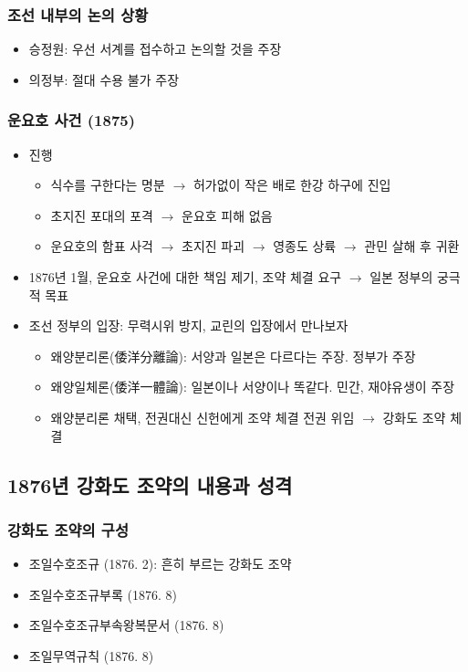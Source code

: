 \subsubsection*{조선 내부의 논의 상황}
\begin{itemize}
    \item 승정원: 우선 서계를 접수하고 논의할 것을 주장
    \item 의정부: 절대 수용 불가 주장
\end{itemize}

\subsubsection*{운요호 사건 (1875)}
\begin{itemize}
    \item 진행
    \begin{itemize}
        \item 식수를 구한다는 명분 $\rightarrow$ 허가없이 작은 배로 한강 하구에 진입
        \item 초지진 포대의 포격 $\rightarrow$ 운요호 피해 없음
        \item 운요호의 함표 사걱 $\rightarrow$ 초지진 파괴 $\rightarrow$ 영종도 상륙 $\rightarrow$ 관민 살해 후 귀환
    \end{itemize}
    \item 1876년 1월, 운요호 사건에 대한 책임 제기, 조약 체결 요구 $\rightarrow$ 일본 정부의 궁극적 목표
    \item 조선 정부의 입장: 무력시위 방지, 교린의 입장에서 만나보자
    \begin{itemize}
        \item 왜양분리론(倭洋分離論): 서양과 일본은 다르다는 주장. 정부가 주장
        \item 왜양일체론(倭洋一體論): 일본이나 서양이나 똑같다. 민간, 재야유생이 주장
        \item 왜양분리론 채택, 전권대신 신헌에게 조약 체결 전권 위임 $\rightarrow$ 강화도 조약 체결
    \end{itemize}
\end{itemize}

\subsection{1876년 강화도 조약의 내용과 성격}

\subsubsection*{강화도 조약의 구성}
\begin{itemize}
    \item 조일수호조규 (1876. 2): 흔히 부르는 강화도 조약
    \item 조일수호조규부록 (1876. 8)
    \item 조일수호조규부속왕복문서 (1876. 8)
    \item 조일무역규칙 (1876. 8)
\end{itemize}

